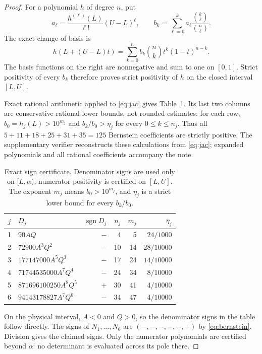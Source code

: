 \documentclass[11pt]{article}
\begin{document}
\begin{proof}
For a polynomial $h$ of degree $n$, put
\[
 a_\ell=\frac{h^{(\ell)}(L)}{\ell!}(U-L)^\ell,\qquad
 b_k=\sum_{\ell=0}^{k}a_\ell
                  \frac{\binom{k}{\ell}}{\binom{n}{\ell}}.
\]
The exact change of basis is
\begin{equation}\label{eq:bernstein}
 h(L+(U-L)t)=\sum_{k=0}^{n}b_k\binom nk t^k(1-t)^{n-k}.
\end{equation}
The basis functions on the right are nonnegative and sum to one on $[0,1]$.
Strict positivity of every $b_k$ therefore proves strict positivity of $h$
on the closed interval $[L,U]$.

Exact rational arithmetic applied to \eqref{eq:jac} gives
Table~\ref{tab:signs}. Its last two columns are conservative rational lower
bounds, not rounded estimates: for each row, $b_0=h_j(L)>10^{m_j}$ and
$b_k/b_0>\eta_j$ for every $0\le k\le n_j$. Thus all
$5+11+18+25+31+35=125$ Bernstein coefficients are strictly positive.
The supplementary verifier reconstructs these calculations from
\eqref{eq:jac}; expanded polynomials and all rational coefficients accompany
the note.

\begin{table}[htbp]
\centering
\small
\begin{tabular}{@{}clrrrr@{}}
\toprule
$j$& $D_j$ & $\operatorname{sgn}D_j$ & $n_j$ & $m_j$ & $\eta_j$\\
\midrule
1&$90AQ$&$-$&4&5&$24/1000$\\
2&$72900A^3Q^2$&$-$&10&14&$28/10000$\\
3&$177147000A^5Q^3$&$-$&17&24&$14/10000$\\
4&$71744535000A^7Q^4$&$-$&24&34&$8/10000$\\
5&$871696100250A^8Q^5$&$+$&30&41&$4/10000$\\
6&$94143178827A^7Q^6$&$-$&34&47&$4/10000$\\
\bottomrule
\end{tabular}
\caption{Exact sign certificate. Denominator signs are used only on
$[L,\alpha)$; numerator positivity is certified on $[L,U]$. The exponent
$m_j$ means $b_0>10^{m_j}$, and $\eta_j$ is a strict lower bound for every
$b_k/b_0$.}\label{tab:signs}
\end{table}

On the physical interval, $A<0$ and $Q>0$, so the denominator signs in the
table follow directly. The signs of $N_1,\ldots,N_6$ are
$(-,-,-,-,-,+)$ by \eqref{eq:bernstein}. Division gives the claimed signs.
Only the numerator polynomials are certified beyond $\alpha$: no determinant
is evaluated across its pole there.
\end{proof}
\end{document}

